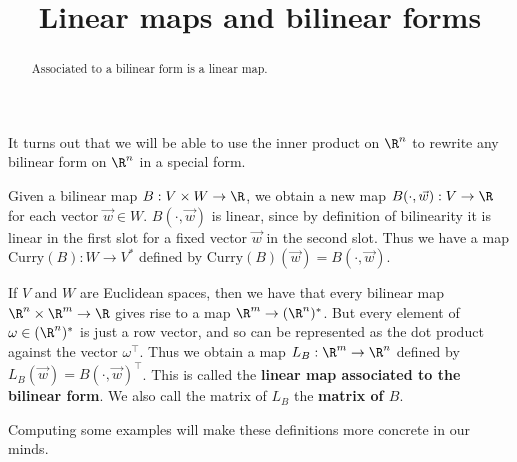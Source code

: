 \documentclass{ximera}
\title{Linear maps and bilinear forms}
\begin{document}
\begin{abstract}
  Associated to a bilinear form is a linear map.
\end{abstract}
	
It turns out that we will be able to use the inner product on $\R^n$ to rewrite any bilinear form on $\R^n$ in a special form. 
	
Given a bilinear map $B:V \times W \to \R$, we obtain a new map $B(\cdot, \vec{w}):V \to \R$ for each vector $\vec{w} \in W$.   $B(\cdot, \vec{w})$ is linear, since 
by definition of bilinearity it is linear in the first slot for a fixed vector $\vec{w}$ in the second slot.  Thus we have a map $\textrm{Curry}(B): W \to V^*$ defined by $\textrm{Curry}(B)(\vec{w}) = B(\cdot, \vec{w})$.
	
If $V$ and $W$ are Euclidean spaces, then we have that every bilinear map $\R^n \times \R^m \to \R$ gives rise to a map $\R^m \to (\R^n)^*$.  But every element
of $ \omega \in (\R^n)^*$ is just a row vector, and so can be represented as the dot product against the vector  $\omega^\top$.  
Thus we obtain a map $L_B:\R^m \to \R^n$ defined by $L_B(\vec{w}) = B(\cdot,\vec{w})^\top$. 
This is called the \textbf{linear map associated to the bilinear form}. 
We also call the matrix of $L_B$ the \textbf{matrix of $B$}.
	
Computing some examples will make these definitions more concrete in our minds.
	
\end{document}
